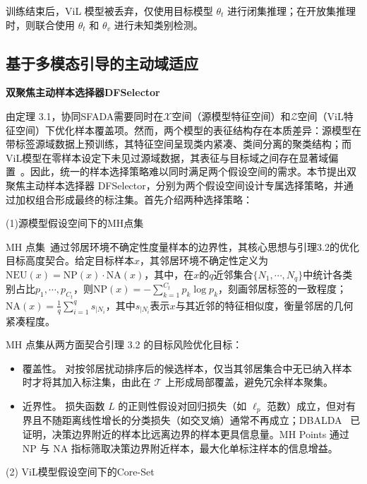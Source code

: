 训练结束后，ViL 模型被丢弃，仅使用目标模型 $\theta_t$ 进行闭集推理；在开放集推理时，则联合使用 $\theta_t$ 和 $\theta_v$ 进行未知类别检测。

\subsection{基于多模态引导的主动域适应}

\noindent\textbf{双聚焦主动样本选择器DFSelector}

由定理 3.1，协同SFADA需要同时在$\mathcal{X}$空间（源模型特征空间）和$\mathcal{Z}$空间（ViL特征空间）下优化样本覆盖项。然而，两个模型的表征结构存在本质差异：源模型在带标签源域数据上预训练，其特征空间呈现类内紧凑、类间分离的聚类结构；而ViL模型在零样本设定下未见过源域数据，其表征与目标域之间存在显著域偏置~\cite{ge2023domain,tang2024source}。因此，统一的样本选择策略难以同时满足两个假设空间的需求。本节提出双聚焦主动样本选择器 DFSelector，分别为两个假设空间设计专属选择策略，并通过加权组合形成最终的标注集。首先介绍两种选择策略：

(1)源模型假设空间下的MH点集

MH 点集~\cite{wang2023mhpl}通过邻居环境不确定性度量样本的边界性，其核心思想与引理3.2的优化目标高度契合。给定目标样本$x$，其邻居环境不确定性定义为$\mathrm{NEU}(x)=\mathrm{NP}(x)\cdot\mathrm{NA}(x)$，其中，在$x$的$q$近邻集合$\{N_1,\cdots,N_q\}$中统计各类别占比$p_1,\cdots,p_{C_t}$，则$\mathrm{NP}(x)=-\sum_{k=1}^{C_t}p_k\log p_k$，刻画邻居标签的一致程度；$\mathrm{NA}(x)=\frac{1}{q}\sum_{i=1}^{q}s_{|N_i}$，其中$s_{|N_i}$表示$x$与其近邻的特征相似度，衡量邻居的几何紧凑程度。

MH 点集从两方面契合引理 3.2 的目标风险优化目标：

\begin{itemize}
    \item 覆盖性。 对按邻居扰动排序后的候选样本，仅当其邻居集合中无已纳入样本时才将其加入标注集，由此在 $\mathcal{T}$ 上形成局部覆盖，避免冗余样本聚集。
    \item 近界性。 损失函数 $L$ 的正则性假设对回归损失（如 $\ell_p$ 范数）成立，但对有界且不随距离线性增长的分类损失（如交叉熵）通常不再成立；DBALDA~\cite{mathelin2022discrepancy} 已证明，决策边界附近的样本比远离边界的样本更具信息量。MH Points 通过 NP 与 NA 指标筛取决策边界附近样本，最大化单标注样本的信息增益。
\end{itemize}


(2) ViL模型假设空间下的Core-Set

